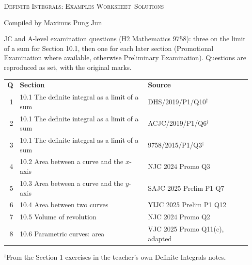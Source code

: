 \documentclass[a4paper,11pt]{book}
\begin{document}
\thispagestyle{fancy}
{\LARGE\scshape Definite Integrals: Examples Worksheet\ifteacher\ Solutions\fi}\par\smallskip
{Compiled by Maximus Pung Jun}\par\medskip
\noindent JC and A-level examination questions (H2 Mathematics 9758): three on the limit of a sum for Section 10.1, then one for each later section (Promotional Examination where available, otherwise Preliminary Examination). Questions are reproduced as set, with the original marks.

\medskip
\noindent\begin{tabular}{@{}rll@{}}
\textbf{Q} & \textbf{Section} & \textbf{Source} \\
1 & 10.1 The definite integral as a limit of a sum & DHS/2019/P1/Q10$^{\dagger}$ \\
2 & 10.1 The definite integral as a limit of a sum & ACJC/2019/P1/Q6$^{\dagger}$ \\
3 & 10.1 The definite integral as a limit of a sum & 9758/2015/P1/Q3$^{\dagger}$ \\
4 & 10.2 Area between a curve and the $x$-axis & NJC 2024 Promo Q3 \\
5 & 10.3 Area between a curve and the $y$-axis & SAJC 2025 Prelim P1 Q7 \\
6 & 10.4 Area between two curves & YIJC 2025 Prelim P1 Q12 \\
7 & 10.5 Volume of revolution & NJC 2024 Promo Q2 \\
8 & 10.6 Parametric curves: area & VJC 2025 Promo Q11(c), adapted \\
\end{tabular}

{\footnotesize $^{\dagger}$From the Section 1 exercises in the teacher's own Definite Integrals notes.}
\ifteacher\else\par\bigskip\fi
\end{document}
